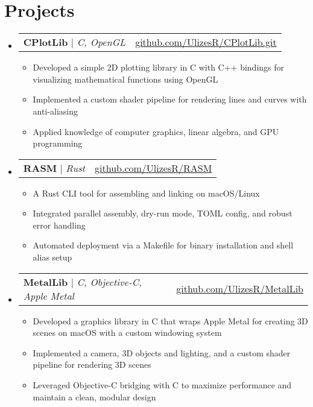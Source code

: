 \documentclass[letterpaper,11pt]{article}
\makeatletter
\newcommand{\resumeItem}[1]{\item\small{#1 \vspace{-2pt}}}
\newcommand{\resumeProjectHeading}[2]{
    \item
    \begin{tabular*}{0.97\textwidth}{l@{\extracolsep{\fill}}r}
      \small#1 & #2 \\
    \end{tabular*}\vspace{-7pt}
}
\newcommand{\resumeSubHeadingListStart}{\begin{itemize}[leftmargin=0.15in, label={}]}
\newcommand{\resumeSubHeadingListEnd}{\end{itemize}}
\newcommand{\resumeItemListStart}{\begin{itemize}}
\newcommand{\resumeItemListEnd}{\end{itemize}\vspace{-5pt}}
\makeatother
\begin{document}
\section{Projects}
\resumeSubHeadingListStart

  \resumeProjectHeading
    {\textbf{CPlotLib} $|$ \emph{C, OpenGL}}{\href{https://github.com/UlizesR/CPlotLib.git}{github.com/UlizesR/CPlotLib.git}}
    \resumeItemListStart
      \resumeItem{Developed a simple 2D plotting library in C with C++ bindings for visualizing mathematical functions using OpenGL}
      \resumeItem{Implemented a custom shader pipeline for rendering lines and curves with anti-aliasing}
      \resumeItem{Applied knowledge of computer graphics, linear algebra, and GPU programming}
    \resumeItemListEnd

    \resumeProjectHeading
    {\textbf{RASM} $|$ \emph{Rust}}{\href{https://github.com/UlizesR/RASM}{github.com/UlizesR/RASM}}
    \resumeItemListStart
      \resumeItem{A Rust CLI tool for assembling and linking on macOS/Linux}
      \resumeItem{Integrated parallel assembly, dry-run mode, TOML config, and robust error handling}
      \resumeItem{Automated deployment via a Makefile for binary installation and shell alias setup}
    \resumeItemListEnd
  \resumeProjectHeading
    {\textbf{MetalLib} $|$ \emph{C, Objective-C, Apple Metal}}{\href{https://github.com/UlizesR/MetalLib}{github.com/UlizesR/MetalLib}}
    \resumeItemListStart
      \resumeItem{Developed a graphics library in C that wraps Apple Metal for creating 3D scenes on macOS with a custom windowing system}
      \resumeItem{Implemented a camera, 3D objects and lighting, and a custom shader pipeline for rendering 3D scenes}
      \resumeItem{Leveraged Objective-C bridging with C to maximize performance and maintain a clean, modular design}
    \resumeItemListEnd

\resumeSubHeadingListEnd
\end{document}
